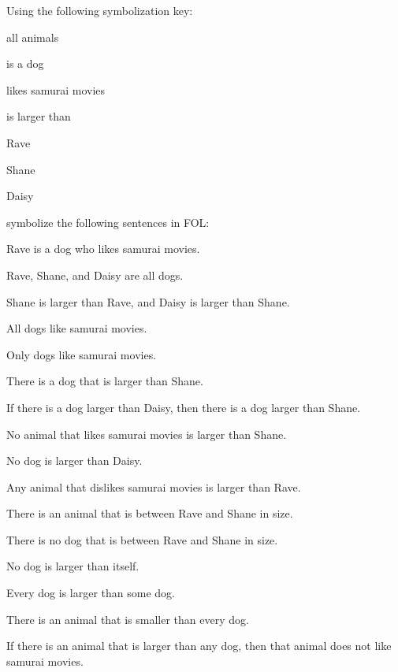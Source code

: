 \problempart 
Using the following symbolization key:
\begin{ekey}
\item[\text{domain}] all animals
\item[\atom{D}{x}]  is a dog
\item[\atom{S}{x}]  likes samurai movies
\item[\atom{L}{x,y}]  is larger than 
\item[r] Rave
\item[h] Shane
\item[d] Daisy
\end{ekey}
symbolize the following sentences in FOL:
\begin{compactlist}
\item Rave is a dog who likes samurai movies.
\item Rave, Shane, and Daisy are all dogs.
\item Shane is larger than Rave, and Daisy is larger than Shane.
\item All dogs like samurai movies.
\item Only dogs like samurai movies.
\item There is a dog that is larger than Shane.
\item If there is a dog larger than Daisy, then there is a dog larger than Shane.
\item No animal that likes samurai movies is larger than Shane.
\item No dog is larger than Daisy.
\item Any animal that dislikes samurai movies is larger than Rave.
\item There is an animal that is between Rave and Shane in size.
\item There is no dog that is between Rave and Shane in size.
\item No dog is larger than itself.
\item Every dog is larger than some dog.
\item There is an animal that is smaller than every dog.
\item If there is an animal that is larger than any dog, then that animal does not like samurai movies.
\end{compactlist}

